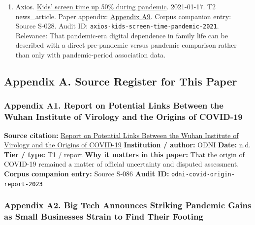 \documentclass[
  american,
  11pt,
  letterpaper,
]{article}
\begin{document}
\begin{enumerate}
  \texttt{dai-pandemic-screen-time-mental-health-2025}. Relevance: That
  heavy youth screen exposure was a measurable feature of the pandemic
  period, not only a cultural impression.
\item
  Axios.
  \href{https://www.axios.com/2021/01/17/kids-screen-time-pandemic}{Kids'
  screen time up 50\% during pandemic}. 2021-01-17. T2 news\_article.
  Paper appendix:
  \hyperref[ch-03-appendix-a9-kids-screen-time-up-50-during-pandemic]{Appendix
  A9}. Corpus companion entry: Source S-028. Audit ID:
  \texttt{axios-kids-screen-time-pandemic-2021}. Relevance: That
  pandemic-era digital dependence in family life can be described with a
  direct pre-pandemic versus pandemic comparison rather than only with
  pandemic-period association data.
\end{enumerate}

\subsection{Appendix A. Source Register for This
Paper}\label{appendix-a.-source-register-for-this-paper-3}

\subsubsection{Appendix A1. Report on Potential Links Between the Wuhan
Institute of Virology and the Origins of
COVID-19}\label{ch-03-appendix-a1-report-on-potential-links-between-the-wuhan-institute-of-virology-and-the-origins-of-covid-19}

\textbf{Source citation:}
\href{https://www.dni.gov/files/ODNI/documents/assessments/Report-on-Potential-Links-Between-the-Wuhan-Institute-of-Virology-and-the-Origins-of-COVID-19-20230623.pdf}{Report
on Potential Links Between the Wuhan Institute of Virology and the
Origins of COVID-19} \textbf{Institution / author:} ODNI \textbf{Date:}
n.d. \textbf{Tier / type:} T1 / report \textbf{Why it matters in this
paper:} That the origin of COVID-19 remained a matter of official
uncertainty and disputed assessment. \textbf{Corpus companion entry:}
Source S-086 \textbf{Audit ID:} \texttt{odni-covid-origin-report-2023}

\subsubsection{Appendix A2. Big Tech Announces Striking Pandemic Gains
as Small Businesses Strain to Find Their
Footing}\label{ch-03-appendix-a2-big-tech-announces-striking-pandemic-gains-as-small-businesses-strain-to-find-their-footing}
\end{document}

